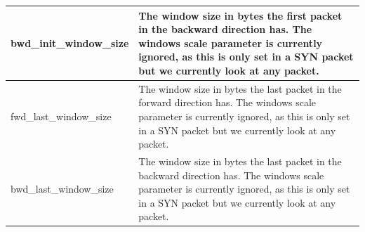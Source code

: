 \documentclass[11pt]{article}
\begin{document}
\begin{table}
\begin{tabular}{|l|p{12cm}|}
    \hline
    bwd\_init\_window\_size & The window size in bytes the first packet in the backward direction has. The windows scale parameter is currently ignored, as this is only set in a SYN packet but we currently look at any packet. \\
    \hline
    fwd\_last\_window\_size & The window size in bytes the last packet in the forward direction has. The windows scale parameter is currently ignored, as this is only set in a SYN packet but we currently look at any packet. \\
    \hline
    bwd\_last\_window\_size & The window size in bytes the last packet in the backward direction has. The windows scale parameter is currently ignored, as this is only set in a SYN packet but we currently look at any packet. \\
    \hline
  \end{tabular}
\end{table}
\end{document}
